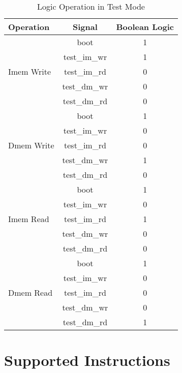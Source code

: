 \documentclass[a4paper]{article}
\begin{document}
\begin{table}[htp]
	\caption{Logic Operation in Test Mode}\label{tab:logic}
	\begin{center}
		\begin{tabular}{|l|c|c|}
		\hline
		\textbf{Operation}	& \textbf{Signal}	& \textbf{Boolean Logic} \\ \hline
		\multirow{5}{*}{Imem Write}& boot		& 1 \\ \cline{2-3}
							& test\_im\_wr 		& 1 \\ \cline{2-3}
							& test\_im\_rd 		& 0 \\ \cline{2-3}
							& test\_dm\_wr 		& 0 \\ \cline{2-3}
							& test\_dm\_rd 		& 0 \\ \hline
		\multirow{5}{*}{Dmem Write}& boot 		& 1 \\ \cline{2-3}
							& test\_im\_wr 		& 0 \\ \cline{2-3}
							& test\_im\_rd 		& 0 \\ \cline{2-3} 
							& test\_dm\_wr 		& 1 \\ \cline{2-3}
							& test\_dm\_rd 		& 0 \\ \hline
		\multirow{5}{*}{Imem Read}& boot 		& 1 \\ \cline{2-3}
							& test\_im\_wr 		& 0 \\ \cline{2-3}
							& test\_im\_rd 		& 1 \\ \cline{2-3} 
							& test\_dm\_wr 		& 0 \\ \cline{2-3}
							& test\_dm\_rd 		& 0 \\ \hline
		\multirow{5}{*}{Dmem Read}& boot 		& 1 \\ \cline{2-3}
							& test\_im\_wr 		& 0 \\ \cline{2-3}
							& test\_im\_rd 		& 0 \\ \cline{2-3} 
							& test\_dm\_wr 		& 0 \\ \cline{2-3}
							& test\_dm\_rd 		& 1 \\ \hline
		\end{tabular}
	\end{center}
\end{table}
\appendix
\section{Supported Instructions}\label{sub:app.Inst}
\end{document}
